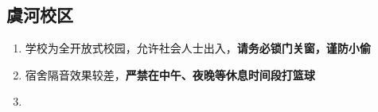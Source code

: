 \subsection[虞河校区]{虞河校区}
\begin{enumerate}
      \item 学校为全开放式校园，允许社会人士出入，\textbf{请务必锁门关窗，谨防小偷}
      \item 宿舍隔音效果较差，\textbf{严禁在中午、夜晚等休息时间段打篮球}
      \item {}
\end{enumerate}
